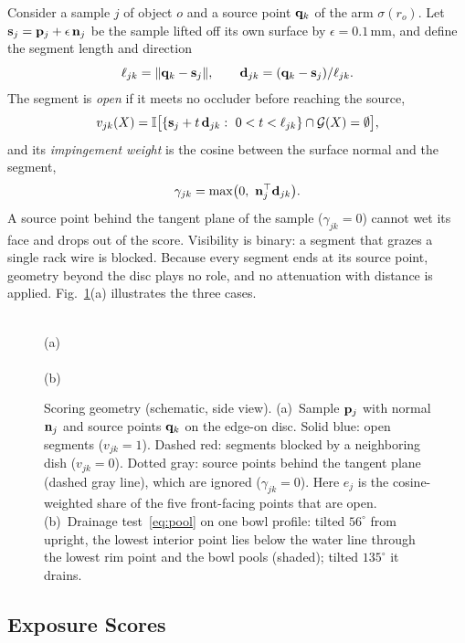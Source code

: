 Consider a sample $j$ of object $o$ and a source point $\mathbf{q}_k$ of the arm $\sigma(r_o)$.
Let $\mathbf{s}_j=\mathbf{p}_j+\epsilon\,\mathbf{n}_j$ be the sample lifted off its own surface by $\epsilon=0.1$\,mm, and define the segment length and direction
\begin{equation}
\ell_{jk}=\lVert\mathbf{q}_k-\mathbf{s}_j\rVert,\qquad \mathbf{d}_{jk}=(\mathbf{q}_k-\mathbf{s}_j)/\ell_{jk}.
\label{eq:segment}
\end{equation}
The segment is \emph{open} if it meets no occluder before reaching the source,
\begin{equation}
v_{jk}(X)=\ind\bigl[\{\vs_j+t\,\vd_{jk}:\ 0<t<\ell_{jk}\}\cap\Occ(X)=\emptyset\bigr],
\label{eq:visibility}
\end{equation}
and its \emph{impingement weight} is the cosine between the surface normal and the segment,
\begin{equation}
\gamma_{jk}=\max\bigl(0,\ \vn_j^\top\vd_{jk}\bigr).
\label{eq:cosine}
\end{equation}
A source point behind the tangent plane of the sample ($\gamma_{jk}=0$) cannot wet its face and drops out of the score.
Visibility is binary: a segment that grazes a single rack wire is blocked.
Because every segment ends at its source point, geometry beyond the disc plays no role, and no attenuation with distance is applied.
Fig.~\ref{fig:scoring}(a) illustrates the three cases.

\begin{figure}[t]
\centering
\\[1pt]
{\footnotesize (a)}\\[6pt]
\\[1pt]
{\footnotesize (b)}
\caption{Scoring geometry (schematic, side view).
(a)~Sample $\mathbf{p}_j$ with normal $\mathbf{n}_j$ and source points $\mathbf{q}_k$ on the edge-on disc.
Solid blue: open segments ($v_{jk}=1$).
Dashed red: segments blocked by a neighboring dish ($v_{jk}=0$).
Dotted gray: source points behind the tangent plane (dashed gray line), which are ignored ($\gamma_{jk}=0$).
Here $e_j$ is the cosine-weighted share of the five front-facing points that are open.
(b)~Drainage test~\eqref{eq:pool} on one bowl profile: tilted $56^\circ$ from upright, the lowest interior point lies below the water line through the lowest rim point and the bowl pools (shaded); tilted $135^\circ$ it drains.}
\label{fig:scoring}
\end{figure}

\subsection{Exposure Scores}
\label{sec:scoring-score}

